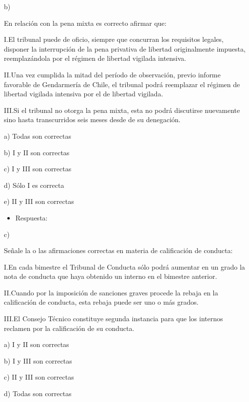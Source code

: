 \documentclass[letterpaper, 11pt]{article}
\begin{document}
b)



En relación con la pena mixta es correcto afirmar que:


I.El tribunal puede de oficio, siempre que concurran los requisitos
legales, disponer la interrupción de la pena privativa de libertad
originalmente impuesta, reemplazándola por el régimen de libertad
vigilada intensiva.



II.Una vez cumplida la mitad del período de observación, previo
informe favorable de Gendarmería de Chile, el tribunal podrá
reemplazar el régimen de libertad vigilada intensiva por el de
libertad vigilada.



III.Si el tribunal no otorga la pena mixta, esta no podrá discutirse
nuevamente sino hasta transcurridos seis meses desde de su denegación.




a) Todas son correctas

b) I y II son correctas

c) I y III son correctas

d) Sólo I es correcta

e) II y III son correctas


\begin{itemize}
\item Respuesta:
\end{itemize}

c)



Señale la o las afirmaciones correctas en materia de calificación de
conducta:


I.En cada bimestre el Tribunal de Conducta sólo podrá aumentar en un
grado la nota de conducta que haya obtenido un interno en el bimestre
anterior.



II.Cuando por la imposición de sanciones graves procede la rebaja en
la calificación de conducta, esta rebaja puede ser uno o más grados.



III.El Consejo Técnico constituye segunda instancia para que los
internos reclamen por la calificación de su conducta.



a) I y II son correctas

b) I y III son correctas

c) II y III son correctas

d) Todas son correctas
\end{document}
